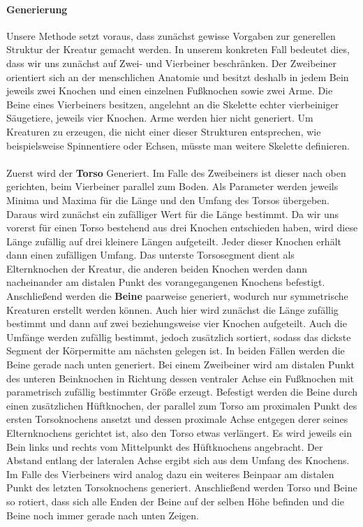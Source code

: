\paragraph{Generierung}
\label{sec:parametricGeneration}
Unsere Methode setzt voraus, dass zunächst gewisse Vorgaben zur generellen Struktur der Kreatur gemacht werden. In unserem konkreten Fall bedeutet dies, dass wir uns zunächst auf Zwei- und Vierbeiner beschränken. Der Zweibeiner orientiert sich an der menschlichen Anatomie und besitzt deshalb in jedem Bein jeweils zwei Knochen und einen einzelnen Fußknochen sowie zwei Arme. Die Beine eines Vierbeiners besitzen, angelehnt an die Skelette echter vierbeiniger Säugetiere, jeweils vier Knochen. Arme werden hier nicht generiert. Um Kreaturen zu erzeugen, die nicht einer dieser Strukturen entsprechen, wie beispielsweise Spinnentiere oder Echsen, müsste man weitere Skelette definieren.\\
\\
Zuerst  wird der \textbf{Torso} Generiert. Im Falle des Zweibeiners ist dieser nach oben gerichten, beim Vierbeiner parallel zum Boden. Als Parameter werden jeweils Minima und Maxima für die Länge und den Umfang des Torsos übergeben. Daraus wird zunächst ein zufälliger Wert für die Länge bestimmt. Da wir uns vorerst für einen Torso bestehend aus drei Knochen entschieden haben, wird diese Länge zufällig auf drei kleinere Längen aufgeteilt. Jeder dieser Knochen erhält dann einen zufälligen Umfang. Das unterste Torsosegment dient als Elternknochen der Kreatur, die anderen beiden Knochen werden dann nacheinander am distalen Punkt des vorangegangenen Knochens befestigt.\\
Anschließend werden die \textbf{Beine} paarweise generiert, wodurch nur symmetrische Kreaturen erstellt werden können. Auch hier wird zunächst die Länge zufällig bestimmt und dann auf zwei beziehungsweise vier Knochen aufgeteilt. Auch die Umfänge werden zufällig bestimmt, jedoch zusätzlich sortiert, sodass das dickste Segment der Körpermitte am nächsten gelegen ist. In beiden Fällen werden die Beine gerade nach unten generiert. Bei einem Zweibeiner wird am distalen Punkt des unteren Beinknochen in Richtung dessen ventraler Achse ein Fußknochen mit parametrisch zufällig bestimmter Größe erzeugt. Befestigt werden die Beine durch einen zusätzlichen Hüftknochen, der parallel zum Torso am proximalen Punkt des ersten Torsoknochens ansetzt und dessen proximale Achse entgegen derer seines Elternknochens gerichtet ist, also den Torso etwas verlängert. Es wird jeweils ein Bein links und rechts vom Mittelpunkt des Hüftknochens angebracht. Der Abstand entlang der lateralen Achse ergibt sich aus dem Umfang des Knochens. Im Falle des Vierbeiners wird analog dazu ein weiteres Beinpaar am distalen Punkt des letzten Torsoknochens generiert. Anschließend werden Torso und Beine so rotiert, dass sich alle Enden der Beine auf der selben Höhe befinden und die Beine noch immer gerade nach unten Zeigen.\\
